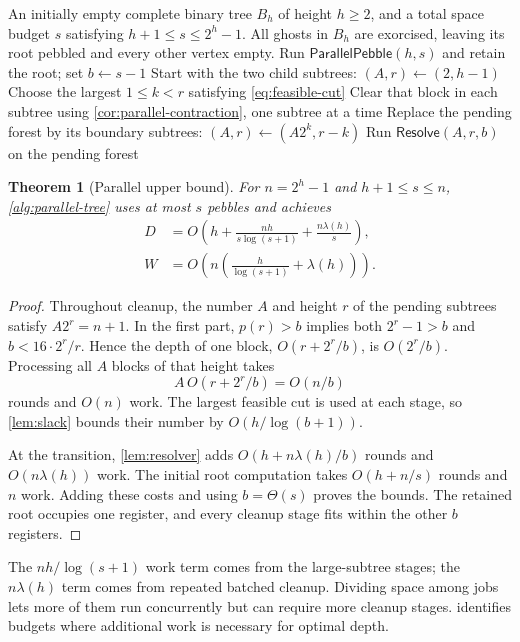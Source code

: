 \documentclass[11pt]{article}
\newtheorem{theorem}{Theorem}[section]
\theoremstyle{definition}
\theoremstyle{remark}
\newcommand{\Sweep}{\mathsf{ParallelPebble}}
\newcommand{\Resolve}{\mathsf{Resolve}}
\begin{document}
\begin{algorithm}[H]
\caption{Parallel block cleanup on complete trees}
\label{alg:parallel-tree}
\begin{algorithmic}[1]
\Require An initially empty complete binary tree $B_h$ of height $h\ge2$, and a total space budget $s$ satisfying $h+1\le s\le2^h-1$.
\Ensure All ghosts in $B_h$ are exorcised, leaving its root pebbled and every other vertex empty.
\State Run $\Sweep(h,s)$ and retain the root; set $b\gets s-1$
\State Start with the two child subtrees: $(A,r)\gets(2,h-1)$
 \State Choose the largest $1\le k<r$ satisfying \cref{eq:feasible-cut}
 \State Clear that block in each subtree using \cref{cor:parallel-contraction}, one subtree at a time
 \State Replace the pending forest by its boundary subtrees: $(A,r)\gets(A2^k,r-k)$
\EndWhile
\State Run $\Resolve(A,r,b)$ on the pending forest
\end{algorithmic}
\end{algorithm}

\begin{theorem}[Parallel upper bound]
\label{thm:parallel-upper}
For $n=2^h-1$ and $h+1\le s\le n$, \cref{alg:parallel-tree} uses at most $s$ pebbles and achieves
\begin{align}
D&=O\!\left(h+\frac{nh}{s\log(s+1)}+\frac{n\lambda(h)}s\right), \label{eq:depth-upper}\\
W&=O\!\left(n\left(\frac h{\log(s+1)}+\lambda(h)\right)\right). \label{eq:depth-schedule-work}
\end{align}
\end{theorem}
\begin{proof}
Throughout cleanup, the number $A$ and height $r$ of the pending subtrees satisfy $A2^r=n+1$. In the first part, $p(r)>b$ implies both $2^r-1>b$ and $b<16\cdot2^r/r$. Hence the depth of one block, $O(r+2^r/b)$, is $O(2^r/b)$. Processing all $A$ blocks of that height takes
\[
A\,O(r+2^r/b)=O(n/b)
\]
rounds and $O(n)$ work. The largest feasible cut is used at each stage, so \cref{lem:slack} bounds their number by $O(h/\log(b+1))$.

At the transition, \cref{lem:resolver} adds $O(h+n\lambda(h)/b)$ rounds and $O(n\lambda(h))$ work. The initial root computation takes $O(h+n/s)$ rounds and $n$ work. Adding these costs and using $b=\Theta(s)$ proves the bounds. The retained root occupies one register, and every cleanup stage fits within the other $b$ registers.
\end{proof}

The $nh/\log(s+1)$ work term comes from the large-subtree stages; the $n\lambda(h)$ term comes from repeated batched cleanup. Dividing space among jobs lets more of them run concurrently but can require more cleanup stages.  identifies budgets where additional work is necessary for optimal depth.
\end{document}
